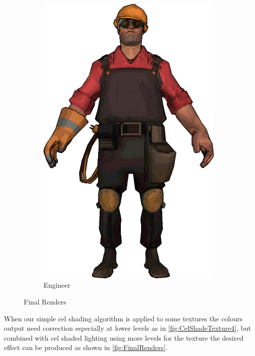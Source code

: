 \begin{figure}[h]
\begin{subfigure}[b]{0.18\textwidth}
        \includegraphics[width=\textwidth]{img/Combined/FinalEngineer.png}
        \caption{Engineer}
 		\label{fig:FinalEngineer}
\end{subfigure}
\caption{Final Renders}
 \label{fig:FinalRenders}
\end{figure} 

When our simple cel shading algorithm is applied to some textures the colours output need correction especially at lower levels as in \autoref{fig:CelShadeTexture4}, but combined with cel shaded lighting using more levels for the texture the desired effect can be produced as shown in \autoref{fig:FinalRenders}. 

